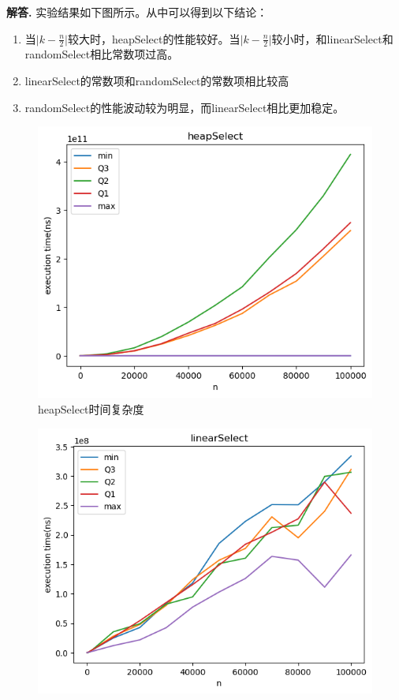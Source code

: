 \documentclass[12pt, a4paper, oneside]{article}
\newenvironment{solution}{\par\noindent\textbf{解答. }}{}
\begin{document}
\begin{solution}
实验结果如下图所示。从中可以得到以下结论：
\begin{enumerate}
    \item 当$\lvert k-\frac{n}{2}\rvert$较大时，heapSelect的性能较好。当$\lvert k-\frac{n}{2}\rvert$较小时，和linearSelect和randomSelect相比常数项过高。
    \item linearSelect的常数项和randomSelect的常数项相比较高
    \item randomSelect的性能波动较为明显，而linearSelect相比更加稳定。
\end{enumerate}
\begin{figure}[!h]
    \centering
    \includegraphics[scale = 0.8]{heapSelect.png}
    \caption{heapSelect时间复杂度}\label{heap}
\end{figure}
\begin{figure}
    \centering
    \includegraphics[scale = 0.8]{linearSelect.png}

\end{figure}
\end{solution}
\end{document}
